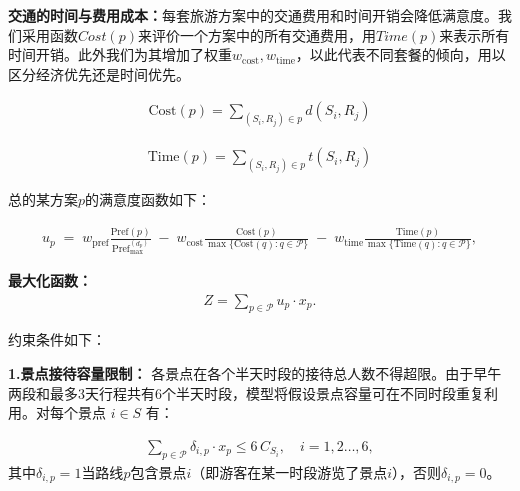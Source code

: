 \textbf{交通的时间与费用成本：}每套旅游方案中的交通费用和时间开销会降低满意度。我们采用函数$Cost(p)$来评价一个方案中的所有交通费用，用$Time(p)$来表示所有时间开销。此外我们为其增加了权重$w_{\text{cost}}, w_{\text{time}}$，以此代表不同套餐的倾向，用以区分经济优先还是时间优先。

\begin{equation}
\begin{aligned}
  \text{Cost}(p) = \sum_{(S_i,R_j)\in p}{d(S_i,R_j)}
\end{aligned}
\end{equation}

\begin{equation}
  \begin{aligned}
    \text{Time}(p) = \sum_{(S_i,R_j)\in p}{t(S_i,R_j)}
  \end{aligned}
\end{equation}
  



总的某方案$p$的满意度函数如下：

\begin{equation}
\begin{aligned}
  u_p \;=\; w_{\text{pref}}\frac{\text{Pref}(p)}{\text{Pref}_{\max}^{(d_p)}} \;-\; w_{\text{cost}}\frac{\text{Cost}(p)}{\max\{\text{Cost}(q):q\in \mathcal{P}\}} \;-\; w_{\text{time}}\frac{\text{Time}(p)}{\max\{\text{Time}(q):q\in \mathcal{P}\}},
\end{aligned}
\end{equation}

\textbf{最大化函数：}
\begin{equation}
  \begin{aligned}
    Z = \sum_{p\in \mathcal{P}}u_{p}\cdot x_{p}.
  \end{aligned}
\end{equation}

约束条件如下：

\noindent\textbf{1.景点接待容量限制：}
各景点在各个半天时段的接待总人数不得超限。由于早午两段和最多3天行程共有6个半天时段，模型将假设景点容量可在不同时段重复利用。对每个景点 $i\in S$ 有：

\begin{equation}
  \begin{aligned}
    \sum_{p\in \mathcal{P}}\delta_{i,p}\cdot x_{p} \leq 6\,C_{S_{i}},\quad i=1,2\dots ,6,
  \end{aligned}
\end{equation}
其中$\delta_{i,p}=1$当路线$p$包含景点$i$（即游客在某一时段游览了景点$i$），否则$\delta_{i,p}=0$。


